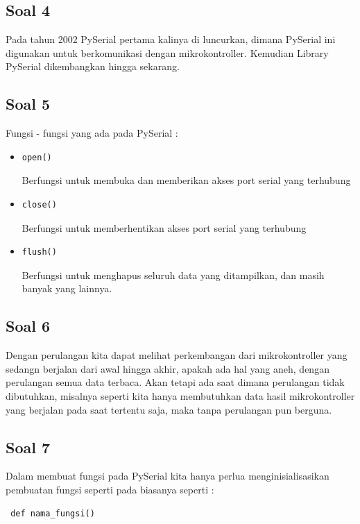 	\subsection{Soal 4}
	Pada tahun 2002 PySerial pertama kalinya di luncurkan, dimana PySerial ini digunakan untuk berkomunikasi dengan mikrokontroller. Kemudian Library PySerial dikembangkan hingga sekarang.
	
	\subsection{Soal 5}
	Fungsi - fungsi yang ada pada PySerial :
		\begin{itemize}
			\item \begin{verbatim}open()\end{verbatim} 
			Berfungsi untuk membuka dan memberikan akses port serial yang terhubung
			\item \begin{verbatim}close()\end{verbatim} 
			Berfungsi untuk memberhentikan akses port serial yang terhubung
			\item \begin{verbatim}flush() \end{verbatim}
			Berfungsi untuk menghapus seluruh data yang ditampilkan, dan masih banyak yang lainnya.
			
		\end{itemize}
	
	\subsection{Soal 6}
	Dengan perulangan kita dapat melihat perkembangan dari mikrokontroller yang sedangn berjalan dari awal hingga akhir, apakah ada hal yang aneh, dengan perulangan semua data terbaca.
	Akan tetapi ada saat dimana perulangan tidak dibutuhkan, misalnya seperti kita hanya membutuhkan data hasil mikrokontroller yang berjalan pada saat tertentu saja, maka tanpa perulangan pun berguna.
	
	\subsection{Soal 7}
	Dalam membuat fungsi pada PySerial kita hanya perlua menginisialisasikan pembuatan fungsi seperti pada biasanya seperti : \begin{verbatim} def nama_fungsi() \end{verbatim}


